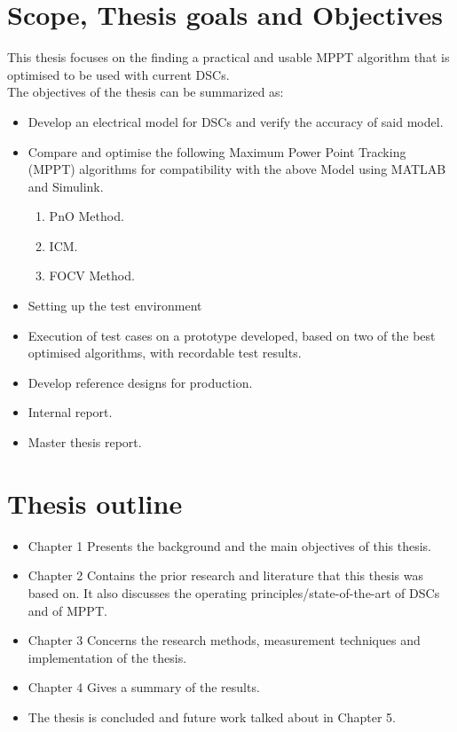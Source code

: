  
 \section{Scope, Thesis goals and Objectives}

This thesis focuses on the finding a practical and usable \ac{MPPT} algorithm that is optimised to be used with current \ac{DSCs}.\\


The objectives of the thesis can be summarized as:
\begin{itemize}

\item Develop an electrical model for DSCs and verify the accuracy of said model.
 
\item Compare and optimise the following Maximum Power Point Tracking (MPPT) algorithms for compatibility with the above Model using MATLAB{\textregistered} and Simulink{\textregistered}.
	\begin{enumerate}
		\item \ac{PnO} Method.
		\item \ac{ICM}.
		\item \ac{FOCV} Method.
		
	\end{enumerate}
\item Setting up the test environment   
\item Execution of test cases on a prototype developed, based on two of the best optimised algorithms, with recordable test results.
\item Develop reference designs for production.
\item Internal report.
\item  Master thesis report. 
\end {itemize}

\section{Thesis outline}
\begin{itemize}
\item Chapter 1 Presents the background and the main objectives of this thesis. \\
\item Chapter 2 Contains the prior research and literature that this thesis was based on. It also discusses the operating principles/state-of-the-art  of \ac{DSCs} and of \ac{MPPT}. \\
\item Chapter 3 Concerns the research methods, measurement techniques and implementation of the thesis.
\item Chapter 4 Gives a summary of the results. 
\item The thesis is concluded and future work talked about in Chapter 5.
\end {itemize}

